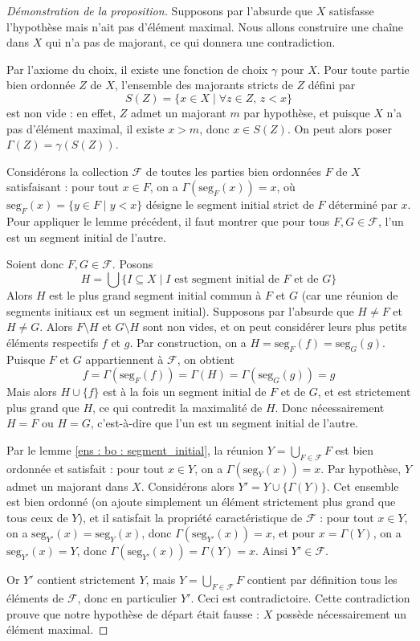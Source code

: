 \begin{proof}[Démonstration de la proposition]
	Supposons par l'absurde que $X$ satisfasse l'hypothèse mais n'ait pas d'élément maximal. Nous allons construire une chaîne dans $X$ qui n'a pas de majorant, ce qui donnera une contradiction.

	Par l'axiome du choix, il existe une fonction de choix $\gamma$ pour $X$. Pour toute partie bien ordonnée $Z$ de $X$, l'ensemble des majorants stricts de $Z$ défini par
	$$S(Z) = \{x \in X \mid \forall z \in Z, \, z < x\}$$
	est non vide : en effet, $Z$ admet un majorant $m$ par hypothèse, et puisque $X$ n'a pas d'élément maximal, il existe $x > m$, donc $x \in S(Z)$. On peut alors poser $\Gamma(Z) = \gamma(S(Z))$.

	Considérons la collection $\mathcal{F}$ de toutes les parties bien ordonnées $F$ de $X$ satisfaisant : pour tout $x \in F$, on a $\Gamma(\mathrm{seg}_F(x)) = x$, où $\mathrm{seg}_F(x) = \{y \in F \mid y < x\}$ désigne le segment initial strict de $F$ déterminé par $x$. Pour appliquer le lemme précédent, il faut montrer que pour tous $F, G \in \mathcal{F}$, l'un est un segment initial de l'autre.

	Soient donc $F, G \in \mathcal{F}$. Posons
	$$H = \bigcup \{I \subseteq X \mid I \text{ est segment initial de } F \text{ et de } G\}$$
	Alors $H$ est le plus grand segment initial commun à $F$ et $G$ (car une réunion de segments initiaux est un segment initial). Supposons par l'absurde que $H \neq F$ et $H \neq G$. Alors $F \setminus H$ et $G \setminus H$ sont non vides, et on peut considérer leurs plus petits éléments respectifs $f$ et $g$. Par construction, on a $H = \mathrm{seg}_F(f) = \mathrm{seg}_G(g)$. Puisque $F$ et $G$ appartiennent à $\mathcal{F}$, on obtient
	$$f = \Gamma(\mathrm{seg}_F(f)) = \Gamma(H) = \Gamma(\mathrm{seg}_G(g)) = g$$
	Mais alors $H \cup \{f\}$ est à la fois un segment initial de $F$ et de $G$, et est strictement plus grand que $H$, ce qui contredit la maximalité de $H$. Donc nécessairement $H = F$ ou $H = G$, c'est-à-dire que l'un est un segment initial de l'autre.

	Par le lemme \ref{ens : bo : segment_initial}, la réunion $Y = \bigcup_{F \in \mathcal{F}} F$ est bien ordonnée et satisfait : pour tout $x \in Y$, on a $\Gamma(\mathrm{seg}_Y(x)) = x$. Par hypothèse, $Y$ admet un majorant dans $X$. Considérons alors $Y' = Y \cup \{\Gamma(Y)\}$. Cet ensemble est bien ordonné (on ajoute simplement un élément strictement plus grand que tous ceux de $Y$), et il satisfait la propriété caractéristique de $\mathcal{F}$ : pour tout $x \in Y$, on a $\mathrm{seg}_{Y'}(x) = \mathrm{seg}_Y(x)$, donc $\Gamma(\mathrm{seg}_{Y'}(x)) = x$, et pour $x = \Gamma(Y)$, on a $\mathrm{seg}_{Y'}(x) = Y$, donc $\Gamma(\mathrm{seg}_{Y'}(x)) = \Gamma(Y) = x$. Ainsi $Y' \in \mathcal{F}$.

	Or $Y'$ contient strictement $Y$, mais $Y = \bigcup_{F \in \mathcal{F}} F$ contient par définition tous les éléments de $\mathcal{F}$, donc en particulier $Y'$. Ceci est contradictoire. Cette contradiction prouve que notre hypothèse de départ était fausse : $X$ possède nécessairement un élément maximal.
\end{proof}

